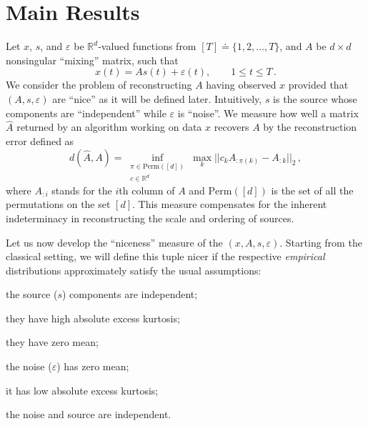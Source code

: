 \documentclass{article} %
\newcommand{\real}{\mathbb{R}}
\newcommand{\eps}{\epsilon}
\renewcommand{\epsilon}{\varepsilon}
\theoremstyle{definition}
\begin{document}
\section{Main Results}
\label{sec:main}
Let $x$, $s$, and $\epsilon$ be $\real^d$-valued functions from $[T]\doteq\{1,2,\ldots,T\}$, and $A$ be $d\times d$ nonsingular ``mixing'' matrix, such that 
\begin{equation}
\label{eq:ICA}
x(t) = As(t)+\epsilon(t), \qquad 1\le t\le T\,.
\end{equation}
We consider the problem of reconstructing $A$ having observed $x$ provided that $(A,s,\epsilon)$ are ``nice'' as it will be defined later. Intuitively, $s$ is the source whose components are ``independent'' while $\epsilon$ is ``noise''.
We measure how well a matrix $\hat{A}$ returned by an algorithm working on data $x$ 
recovers $A$ by the reconstruction error defined as
\[
d(\hat{A}, A) = \inf_{
		\substack{\pi \in \mathrm{Perm}([d]) \\ c\in \real^d}} 
		\max_{k} || c_k A_{:\pi(k)} - A_{:k} ||_2\,,
\]
where $A_{:i}$ stands for the $i$th column of $A$ and
$\mathrm{Perm}([d])$ is the set of all the permutations on the set $[d]$.
This measure compensates for the inherent indeterminacy in reconstructing the scale and ordering of sources.

Let us now develop the ``niceness'' measure of the $(x,A,s,\eps)$. 
Starting from the classical setting, we will define this tuple nicer if the respective \emph{empirical} 
distributions approximately satisfy the usual assumptions: 
\begin{inparaenum}
\item the source ($s$) components are independent;
\item they have high absolute excess kurtosis;
\item they have zero mean;
\item the noise ($\eps$) has  zero mean;
\item it has low absolute excess kurtosis;
\item the noise and source are independent.
\end{inparaenum}
\end{document}
